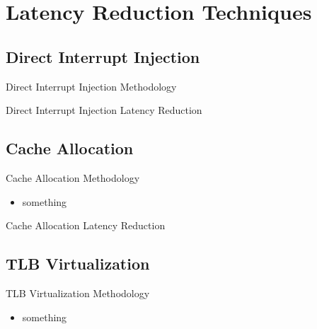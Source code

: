\documentclass[10pt,hyperref={hyperfootnotes=false}, xcolor={usenames, dvipsnames}]{beamer}
\begin{document}
\section{Latency Reduction Techniques}

\subsection{Direct Interrupt Injection}
\begin{frame} {Direct Interrupt Injection} {Methodology}
    \begingroup
	
	\endgroup
\end{frame}

\begin{frame} [allowframebreaks] {Direct Interrupt Injection} {Latency Reduction}
    \begingroup
	
	\endgroup
\end{frame}

\subsection{Cache Allocation}
\begin{frame}{Cache Allocation} {Methodology}
   \begin{itemize}
   \item {something}
  \end{itemize}
\end{frame}

\begin{frame}[allowframebreaks]{Cache Allocation} {Latency Reduction}
    \begingroup
	
	\endgroup
\end{frame}

\subsection{TLB Virtualization}
\begin{frame}{TLB Virtualization} {Methodology}
   \begin{itemize}
   \item {something}
  \end{itemize}
\end{frame}
\end{document}

